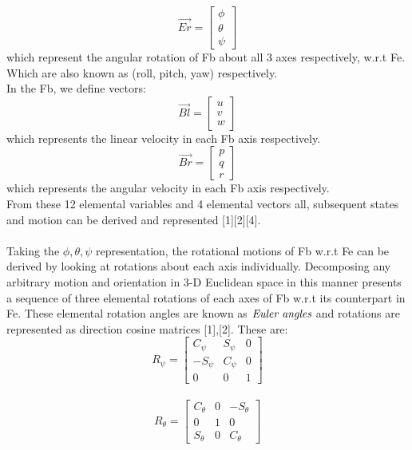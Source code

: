\documentclass[12pt,a4paper,twoside]{report}
\begin{document}
				$$
				\vec{Er} = 
				\begin{bmatrix}
					\phi \\
					\theta \\
					\psi
				\end{bmatrix}
				$$
				which represent the angular rotation of Fb about all 3 axes respectively, w.r.t Fe. Which are also known as (roll, pitch, yaw) respectively.
				\\
				In the Fb, we define vectors:
				\\
				$$
				\vec{Bl} = 
				\begin{bmatrix}
					u \\
					v \\
					w
				\end{bmatrix}
				$$
				which represents the linear velocity in each Fb axis respectively.
				\\
				$$
				\vec{Br} = 
				\begin{bmatrix}
					p \\
					q \\
					r
				\end{bmatrix}
				$$
				which represents the angular velocity in each Fb axis respectively.
				\\
				From these 12 elemental variables and 4 elemental vectors all, subsequent states and motion can be derived and represented [1][2][4].
				\\ \\
				Taking the \(\phi, \theta, \psi\) representation, the rotational motions of Fb w.r.t Fe can be derived by looking at rotations about each axis individually. Decomposing any arbitrary motion and orientation in 3-D Euclidean space in this manner presents a sequence of three elemental rotations of each axes of Fb w.r.t its counterpart in Fe. These elemental rotation angles are known as $\emph{Euler angles}$  and rotations are represented as direction cosine matrices [1],[2]. These are:
				\\
				$$
				R_\psi = 
				\begin{bmatrix}
					C_\psi & S_\psi & 0  \\
					-S_\psi & C_\psi & 0  \\
					0 & 0 & 1
				\end{bmatrix}
				$$
				\\
				$$
				R_\theta = 
				\begin{bmatrix}
					C_\theta & 0 & -S_\theta \\
					0 & 1 & 0 \\
					S_\theta & 0 & C_\theta
				\end{bmatrix}
				$$
\end{document}
